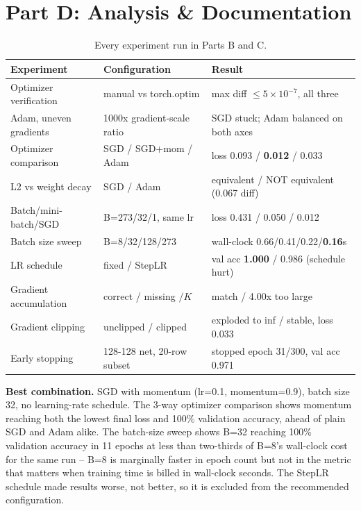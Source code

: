 \documentclass[11pt,a4paper]{article}
\begin{document}
\section*{Part D: Analysis \& Documentation}

\begin{table}[H]
\centering
\small
\begin{tabular}{lll}
\toprule
\textbf{Experiment} & \textbf{Configuration} & \textbf{Result} \\
\midrule
Optimizer verification & manual vs torch.optim & max diff $\le 5\times10^{-7}$, all three \\
Adam, uneven gradients & 1000x gradient-scale ratio & SGD stuck; Adam balanced on both axes \\
Optimizer comparison & SGD / SGD+mom / Adam & loss 0.093 / \textbf{0.012} / 0.033 \\
L2 vs weight decay & SGD / Adam & equivalent / NOT equivalent (0.067 diff) \\
Batch/mini-batch/SGD & B=273/32/1, same lr & loss 0.431 / 0.050 / 0.012 \\
Batch size sweep & B=8/32/128/273 & wall-clock 0.66/0.41/0.22/\textbf{0.16}s \\
LR schedule & fixed / StepLR & val acc \textbf{1.000} / 0.986 (schedule hurt) \\
Gradient accumulation & correct / missing $/K$ & match / 4.00x too large \\
Gradient clipping & unclipped / clipped & exploded to inf / stable, loss 0.033 \\
Early stopping & 128-128 net, 20-row subset & stopped epoch 31/300, val acc 0.971 \\
\bottomrule
\end{tabular}
\caption{Every experiment run in Parts B and C.}
\end{table}

\textbf{Best combination.} SGD with momentum (lr=0.1, momentum=0.9), batch size 32, no
learning-rate schedule. The 3-way optimizer comparison shows momentum reaching both the
lowest final loss and 100\% validation accuracy, ahead of plain SGD and Adam alike. The
batch-size sweep shows B=32 reaching 100\% validation accuracy in 11 epochs at less than
two-thirds of B=8's wall-clock cost for the same run -- B=8 is marginally faster in
epoch count but not in the metric that matters when training time is billed in
wall-clock seconds. The StepLR schedule made results worse, not better, so it is
excluded from the recommended configuration.
\end{document}
